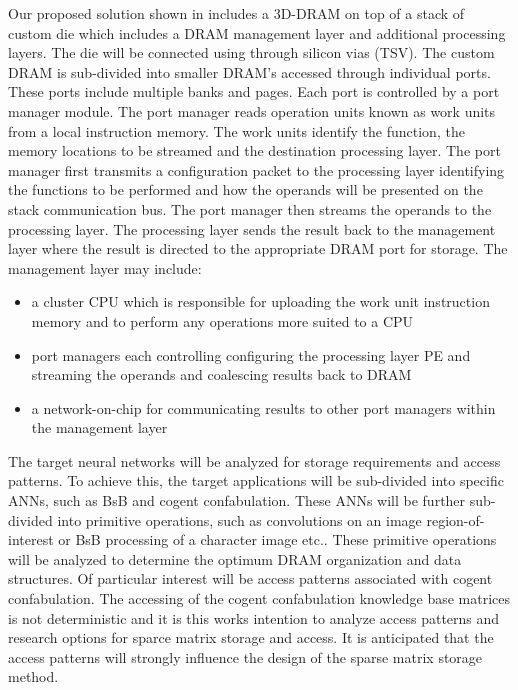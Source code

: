 Our proposed solution shown in  includes a 3D-DRAM on top of a stack of custom die which includes a 
DRAM management layer and additional processing layers.
The die will be connected using through silicon vias (TSV).
The custom DRAM is sub-divided into smaller DRAM's accessed through individual ports. These ports include multiple banks and pages.
Each port is controlled by a port manager module.
The port manager reads operation units known as work units from a local instruction memory.
The work units identify the function, the memory locations to be streamed and the destination processing layer.
The port manager first transmits a configuration packet to the processing layer identifying the functions to be performed and
how the operands will be presented on the stack communication bus.
The port manager then streams the operands to the processing layer. The processing layer sends the result back to the management layer where the result
is directed to the appropriate DRAM port for storage.
The management layer may include:
\begin{itemize}
  \itemsep0em 
  \item a cluster CPU which is responsible for uploading the work unit instruction memory and to perform any operations more suited to a CPU
  \item port managers each controlling configuring the processing layer PE and streaming the operands and coalescing results back to DRAM
  \item a network-on-chip for communicating results to other port managers within the management layer 
\end{itemize}
\vspace{-1mm}

The target neural networks will be analyzed for storage requirements and access patterns.
To achieve this, the target applications will be sub-divided into specific ANNs, such as BsB and cogent confabulation.
These ANNs will be further sub-divided into primitive operations, such as convolutions on an image region-of-interest or BsB processing of a character image etc..
These primitive operations will be analyzed to determine the optimum DRAM organization and data structures.
Of particular interest will be access patterns associated with cogent confabulation. The accessing of the cogent confabulation knowledge base matrices is 
not deterministic and it is this works intention to analyze access patterns and research options for sparce matrix storage and access.
It is anticipated that the access patterns will strongly influence the design of the sparse matrix storage method.

